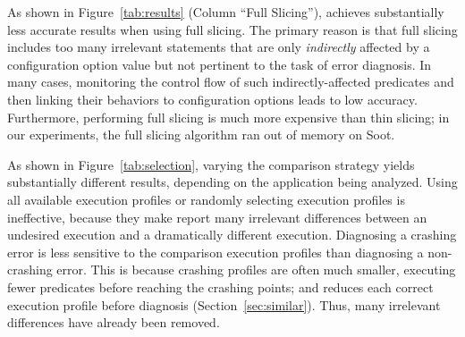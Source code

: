 As shown in Figure~\ref{tab:results}  (Column ``Full Slicing''),
\ourtool achieves substantially less accurate results when using
full slicing. The primary reason is that full slicing includes
too many irrelevant statements that are only \textit{indirectly} affected by
a configuration option value but not pertinent to the task of
error diagnosis. In many cases, monitoring the control flow
of such indirectly-affected predicates and then linking their
behaviors to configuration options leads to low accuracy. Furthermore,
performing full slicing is much more expensive than thin slicing; in
our experiments, the full slicing algorithm ran out of
memory on Soot.



As shown in Figure~\ref{tab:selection}, varying the comparison
strategy yields substantially different results,
depending on the application being analyzed.
Using all available execution profiles or randomly
selecting execution profiles is ineffective, because
they make \ourtool report many irrelevant
differences between an undesired
execution and a dramatically different execution.
Diagnosing a crashing error is less sensitive 
to the comparison execution profiles than diagnosing a non-crashing error.
This is because crashing profiles are often much smaller, executing
fewer predicates before reaching the crashing points; and \ourtool
reduces each correct execution profile before diagnosis (Section~\ref{sec:similar}).
Thus, many irrelevant differences have already been removed.




